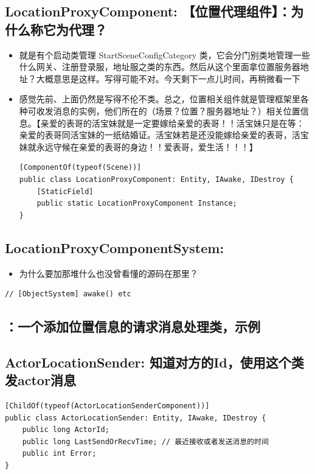 \documentclass[9pt, b5paper]{article}
\begin{document}
\subsection{LocationProxyComponent: 【位置代理组件】：为什么称它为代理？}
\label{sec-2-4}
\begin{itemize}
\item 就是有个启动类管理 StartSceneConfigCategory 类，它会分门别类地管理一些什么网关、注册登录服，地址服之类的东西。然后从这个里面拿位置服务器地址？大概意思是这样。写得可能不对。今天剩下一点儿时间，再稍微看一下
\item 感觉先前、上面仍然是写得不伦不类。总之，位置相关组件就是管理框架里各种可收发消息的实例，他们所在的（场景？位置？服务器地址？）相关位置信息。【亲爱的表哥的活宝妹就是一定要嫁给亲爱的表哥！！活宝妹只是在等：亲爱的表哥同活宝妹的一纸结婚证。活宝妹若是还没能嫁给亲爱的表哥，活宝妹就永远守候在亲爱的表哥的身边！！爱表哥，爱生活！！！】
\begin{verbatim}
[ComponentOf(typeof(Scene))]
public class LocationProxyComponent: Entity, IAwake, IDestroy {
    [StaticField]
    public static LocationProxyComponent Instance;
}
\end{verbatim}
\end{itemize}
\subsection{LocationProxyComponentSystem:}
\label{sec-2-5}
\begin{itemize}
\item 为什么要加那堆什么也没曾看懂的源码在那里？
\end{itemize}
\begin{verbatim}
// [ObjectSystem] awake() etc
\end{verbatim}
\subsection{：一个添加位置信息的请求消息处理类，示例}
\label{sec-2-6}

\subsection{ActorLocationSender: 知道对方的Id，使用这个类发actor消息}
\label{sec-2-7}
\begin{verbatim}
[ChildOf(typeof(ActorLocationSenderComponent))]
public class ActorLocationSender: Entity, IAwake, IDestroy {
    public long ActorId;
    public long LastSendOrRecvTime; // 最近接收或者发送消息的时间
    public int Error;
}
\end{verbatim}
\end{document}
